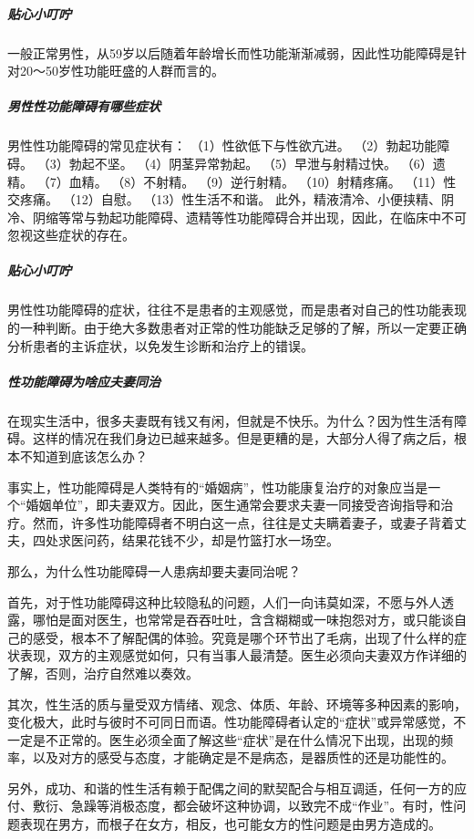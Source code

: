 \subparagraph{贴心小叮咛}

一般正常男性，从59岁以后随着年龄增长而性功能渐渐减弱，因此性功能障碍是针对20～50岁性功能旺盛的人群而言的。

\subparagraph{男性性功能障碍有哪些症状}

男性性功能障碍的常见症状有： 
 （1）性欲低下与性欲亢进。 
 （2）勃起功能障碍。 
 （3）勃起不坚。 
 （4）阴茎异常勃起。 
 （5）早泄与射精过快。 
 （6）遗精。 
 （7）血精。 
 （8）不射精。 
 （9）逆行射精。 
 （10）射精疼痛。 
 （11）性交疼痛。 
 （12）自慰。 
 （13）性生活不和谐。 
 此外，精液清冷、小便挟精、阴冷、阴缩等常与勃起功能障碍、遗精等性功能障碍合并出现，因此，在临床中不可忽视这些症状的存在。

\subparagraph{贴心小叮咛}

男性性功能障碍的症状，往往不是患者的主观感觉，而是患者对自己的性功能表现的一种判断。由于绝大多数患者对正常的性功能缺乏足够的了解，所以一定要正确分析患者的主诉症状，以免发生诊断和治疗上的错误。

\subparagraph{性功能障碍为啥应夫妻同治}

在现实生活中，很多夫妻既有钱又有闲，但就是不快乐。为什么？因为性生活有障碍。这样的情况在我们身边已越来越多。但是更糟的是，大部分人得了病之后，根本不知道到底该怎么办？

事实上，性功能障碍是人类特有的“婚姻病”，性功能康复治疗的对象应当是一个“婚姻单位”，即夫妻双方。因此，医生通常会要求夫妻一同接受咨询指导和治疗。然而，许多性功能障碍者不明白这一点，往往是丈夫瞒着妻子，或妻子背着丈夫，四处求医问药，结果花钱不少，却是竹篮打水一场空。

那么，为什么性功能障碍一人患病却要夫妻同治呢？

首先，对于性功能障碍这种比较隐私的问题，人们一向讳莫如深，不愿与外人透露，哪怕是面对医生，也常常是吞吞吐吐，含含糊糊或一味抱怨对方，或只能谈自己的感受，根本不了解配偶的体验。究竟是哪个环节出了毛病，出现了什么样的症状表现，双方的主观感觉如何，只有当事人最清楚。医生必须向夫妻双方作详细的了解，否则，治疗自然难以奏效。

其次，性生活的质与量受双方情绪、观念、体质、年龄、环境等多种因素的影响，变化极大，此时与彼时不可同日而语。性功能障碍者认定的“症状”或异常感觉，不一定是不正常的。医生必须全面了解这些“症状”是在什么情况下出现，出现的频率，以及对方的感受与态度，才能确定是不是病态，是器质性的还是功能性的。

另外，成功、和谐的性生活有赖于配偶之间的默契配合与相互调适，任何一方的应付、敷衍、急躁等消极态度，都会破坏这种协调，以致完不成“作业”。有时，性问题表现在男方，而根子在女方，相反，也可能女方的性问题是由男方造成的。

